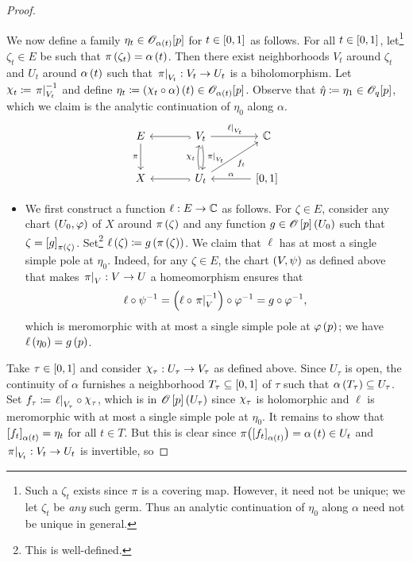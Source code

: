 \documentclass[../Moduli_Spaces_of_Riemann_Surfaces.tex]{subfiles}
\begin{document}
\begin{proof}
\begin{itemize}
        \end{itemize}
        We now define a family $\eta_t\in\mathscr{O}_{\alpha\left(t\right)}\!\left[p\right]$ for $t\in\left[0,1\right]$ as follows. For all $t\in\left[0,1\right]$, let\footnote{Such a $\zeta_t$ exists since $\pi$ is a covering map. However, it need not be unique; we let $\zeta_t$ be \textit{any} such germ. Thus an analytic continuation of $\eta_0$ along $\alpha$ need not be unique in general.} $\zeta_t\in E$ be such that $\pi\left(\zeta_t\right)=\alpha\left(t\right)$. Then there exist neighborhoods $V_t$ around $\zeta_t$ and $U_t$ around $\alpha\left(t\right)$ such that $\left.\pi\right|_{V_t}:V_t\to U_t$ is a biholomorphism. Let $\cchi_t\coloneqq\l.\pi\r|_{V_t}^{-1}$ and define $\eta_t\coloneqq\l(\cchi_t\circ\alpha\r)\l(t\r)\in\HOLO_{\alpha\l(t\r)}\!\l[p\r]$. Observe that $\hat{\eta}\coloneqq\eta_1\in\mathscr{O}_q\!\left[p\right]$, which we claim is the analytic continuation of $\eta_0$ along $\alpha$.
        \begin{equation*}
            \begin{tikzcd}[column sep=0.5in, row sep=0.3in]
                E \ar[d, "\pi"'] & V_t \ar[l, hook] \ar[r, "\l.\ell\r|_{V_t}"] \ar[d, "\l.\pi\r|_{V_t}", bend left=10] & \C \\
                X & U_t \ar[l, hook] \ar[u, "\cchi_t", bend left=10] \ar[ur, "f_t"'] & \l[0,1\r] \ar[l, "\alpha"']
            \end{tikzcd}
        \end{equation*}
        \begin{itemize}
            \item We first construct a function $\ell:E\to\mathbb{C}$ as follows. For $\zeta\in E$, consider any chart $\left(U_0,\varphi\right)$ of $X$ around $\pi\left(\zeta\right)$ and any function $g\in\mathscr{O}\left[p\right]\left(U_0\right)$ such that $\zeta=\left[g\right]_{\pi\left(\zeta\right)}$. Set\footnote{This is well-defined.} $\ell\left(\zeta\right)\coloneqq g\left(\pi\left(\zeta\right)\right)$. We claim that $\ell$ has at most a single simple pole at $\eta_0$. Indeed, for any $\zeta\in E$, the chart $\left(V,\psi\right)$ as defined above that makes $\left.\pi\right|_V:V\to U$ a homeomorphism ensures that
                \begin{equation*}
                    \ell\circ\psi^{-1}=\left(\ell\circ\left.\pi\right|_V^{-1}\right)\circ\varphi^{-1}=g\circ\varphi^{-1},
                \end{equation*}
                which is meromorphic with at most a single simple pole at $\varphi\left(p\right)$; we have $\ell\left(\eta_0\right)=g\left(p\right)$.
        \end{itemize}
        Take $\tau\in\left[0,1\right]$ and consider $\cchi_\tau:U_\tau\to V_\tau$ as defined above. Since $U_\tau$ is open, the continuity of $\alpha$ furnishes a neighborhood $T_\tau\subseteq\left[0,1\right]$ of $\tau$ such that $\alpha\left(T_\tau\right)\subseteq U_\tau$. Set $f_\tau\coloneqq\l.\ell\r|_{V_\tau}\circ\cchi_\tau$, which is in $\mathscr{O}\left[p\right]\left(U_\tau\right)$ since $\cchi_\tau$ is holomorphic and $\ell$ is meromorphic with at most a single simple pole at $\eta_0$. It remains to show that $\left[f_t\right]_{\alpha\left(t\right)}=\eta_t$ for all $t\in T$. But this is clear since $\pi\bigl(\left[f_t\right]_{\alpha\left(t\right)}\bigr)=\alpha\left(t\right)\in U_t$ and $\left.\pi\right|_{V_t}:V_t\to U_t$ is invertible, so

\end{proof}
\end{document}

